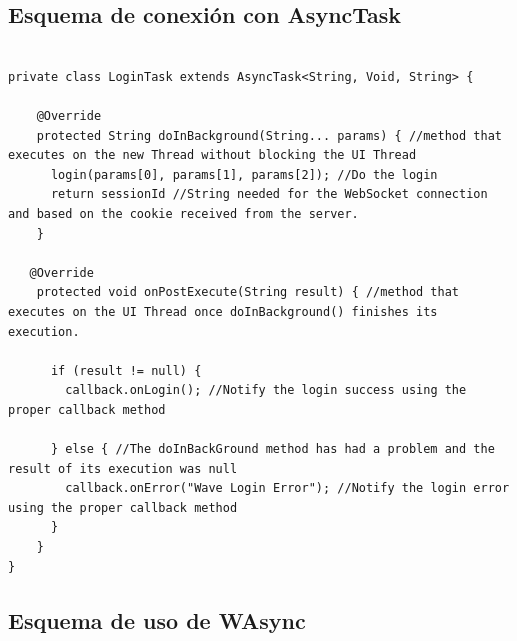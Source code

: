 \subsection{Esquema de conexión con AsyncTask}\label{ssec:codeAsynctask}	  
	  
	  \begin{lstlisting}[frame=single]
	  
private class LoginTask extends AsyncTask<String, Void, String> {
    
    @Override
    protected String doInBackground(String... params) { //method that executes on the new Thread without blocking the UI Thread
      login(params[0], params[1], params[2]); //Do the login 
      return sessionId //String needed for the WebSocket connection and based on the cookie received from the server.     
    }
   
   @Override
    protected void onPostExecute(String result) { //method that executes on the UI Thread once doInBackground() finishes its execution.    
      
      if (result != null) { 
        callback.onLogin(); //Notify the login success using the proper callback method
        
      } else { //The doInBackGround method has had a problem and the result of its execution was null
        callback.onError("Wave Login Error"); //Notify the login error using the proper callback method      
      }
    }
}    
	  \end{lstlisting} 
	  
\subsection{Esquema de uso de WAsync}\label{ssec:codewAsync}
	  	  
